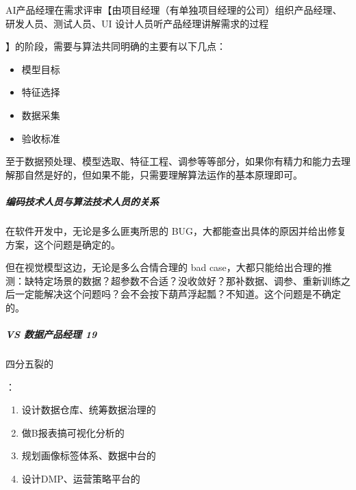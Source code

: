 \documentclass[letterpaper,10pt,english]{sphinxmanual}
\begin{document}
AI产品经理在需求评审【由项目经理（有单独项目经理的公司）组织产品经理、研发人员、测试人员、UI
设计人员听产品经理讲解需求的过程%
\begin{footnote}[288]\sphinxAtStartFootnote
{}
%
\end{footnote}】的阶段，需要与算法共同明确的主要有以下几点：%
\begin{footnote}[289]\sphinxAtStartFootnote
{}
%
\end{footnote}
\begin{itemize}
\item {} 
模型目标

\item {} 
特征选择

\item {} 
数据采集

\item {} 
验收标准

\end{itemize}

至于数据预处理、模型选取、特征工程、调参等等部分，如果你有精力和能力去理解那自然是好的，但如果不能，只需要理解算法运作的基本原理即可。


\subparagraph{编码技术人员与算法技术人员的关系}
\label{\detokenize{chapter_introduction/AI_PM:id17}}
在软件开发中，无论是多么匪夷所思的
BUG，大都能查出具体的原因并给出修复方案，这个问题是确定的。

但在视觉模型这边，无论是多么合情合理的 bad
case，大都只能给出合理的推测：缺特定场景的数据？超参数不合适？没收敛好？那补数据、调参、重新训练之后一定能解决这个问题吗？会不会按下葫芦浮起瓢？不知道。这个问题是不确定的。


\subparagraph{VS 数据产品经理 19\sphinxfootnotemark[290]}
\label{\detokenize{chapter_introduction/AI_PM:vs-19}}%
\begin{footnotetext}[290]\sphinxAtStartFootnote
{}
%
\end{footnotetext}\ignorespaces 
四分五裂的%
\begin{footnote}[291]\sphinxAtStartFootnote
{}
%
\end{footnote}：
\begin{enumerate}
%
\item {} 
设计数据仓库、统筹数据治理的

\item {} 
做B报表搞可视化分析的

\item {} 
规划画像标签体系、数据中台的

\item {} 
设计DMP、运营策略平台的

\end{enumerate}
\end{document}
